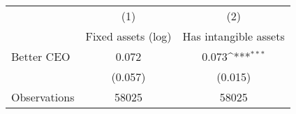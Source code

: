 {
\def\sym#1{\ifmmode^{#1}\else\(^{#1}\)\fi}
\begin{tabular}{l*{2}{c}}
\hline\hline
                    &\multicolumn{1}{c}{(1)}&\multicolumn{1}{c}{(2)}\\
                    &\multicolumn{1}{c}{Fixed assets (log)}&\multicolumn{1}{c}{Has intangible assets}\\
\hline
Better CEO          &       0.072         &       0.073\sym{***}\\
                    &     (0.057)         &     (0.015)         \\
\hline
Observations        &       58025         &       58025         \\
\hline\hline
\end{tabular}
}

